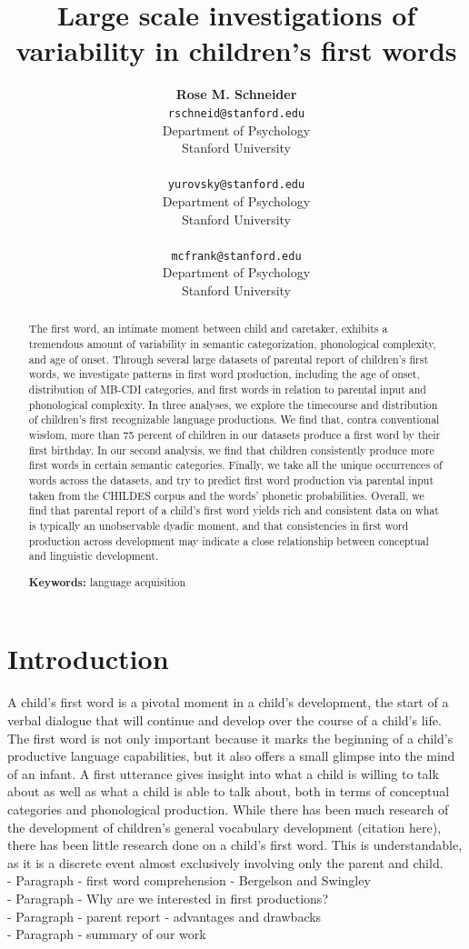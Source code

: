 \documentclass[10pt,letterpaper]{article}
\title{Large scale investigations of variability in children's first words}
\author{{\large \bf Rose M. Schneider} \\ \texttt{rschneid@stanford.edu}\\ Department of Psychology \\ Stanford University \\ 
\And {\large \bf Daniel Yurovsky} \\ \texttt{yurovsky@stanford.edu} \\ Department of Psychology \\ Stanford University \\ 
\And {\large \bf Michael C. Frank} \\ \texttt{mcfrank@stanford.edu} \\ Department of Psychology \\ Stanford University \\ }
\begin{document}
\maketitle


\begin{abstract}
The first word, an intimate moment between child and caretaker, exhibits a tremendous amount of variability in semantic categorization, phonological complexity, and age of onset. Through several large datasets of parental report of children's first words, we investigate patterns in first word production, including the age of onset, distribution of MB-CDI categories, and first words in relation to parental input and phonological complexity. In three analyses, we explore the timecourse and distribution of children's first recognizable language productions. We find that, contra conventional wisdom, more than 75 percent of children in our datasets produce a first word by their first birthday. In our second analysis, we find that children consistently produce more first words in certain semantic categories. Finally, we take all the unique occurrences of words across the datasets, and try to predict first word production via parental input taken from the CHILDES corpus and the words' phonetic probabilities. Overall, we find that parental report of a child's first word yields rich and consistent data on what is typically an unobservable dyadic moment, and that consistencies in first word production across development may indicate a close relationship between conceptual and linguistic development.

\textbf{Keywords:}
language acquisition
\end{abstract}

\section{Introduction}
A child's first word is a pivotal moment in a child's development, the start of a verbal dialogue that will continue and develop over the course of a child's life. The first word is not only important because it marks the beginning of a child's productive language capabilities, but it also offers a small glimpse into the mind of an infant. A first utterance gives insight into what a child is willing to talk about as well as what a child is able to talk about, both in terms of conceptual categories and phonological production. While there has been much research of the development of children's general vocabulary development (citation here), there has been little research done on a child's first word. This is understandable, as it is a discrete event almost exclusively involving only the parent and child. \\
- Paragraph - first word comprehension - Bergelson and Swingley\\
- Paragraph - Why are we interested in first productions?\\
- Paragraph - parent report - advantages and drawbacks \\
- Paragraph - summary of our work\\
\end{document}
